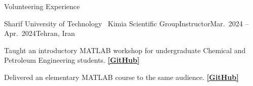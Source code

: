 \documentclass[]{kyvernitis-resume}
\begin{document}
\begin{section}{Volunteering Experience}
    \begin{subsection}{Sharif University of Technology \textemdash\ Kimia Scientific Group}{Instructor}{Mar.\ 2024 -- Apr.\ 2024}{Tehran, Iran}
        \item Taught an introductory MATLAB workshop for undergraduate Chemical and Petroleum Engineering students. \href{https://github.com/SinaGhanbarii/Introduction-To-MATLAB-Workshop}{\textbf{[GitHub]}}
        \item Delivered an elementary MATLAB course to the same audience. \href{https://github.com/SinaGhanbarii/Elementary-MATLAB-Course}{\textbf{[GitHub]}}
    \end{subsection}
\end{section}

\end{document}
